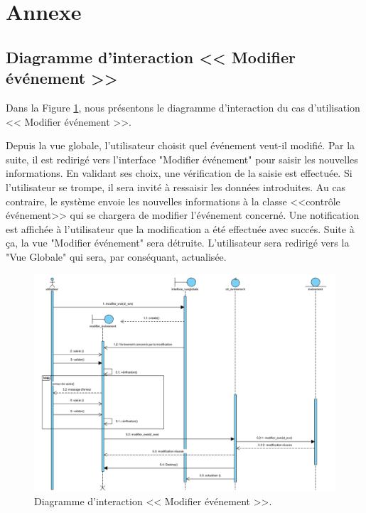 
\appendix
\chapter*{Annexe}
\renewcommand{\headrulewidth}{1pt}




\section*{Diagramme d'interaction << Modifier \'ev\'enement >>}

Dans la Figure \ref{modifierevent}, nous pr\'esentons le diagramme d'interaction du cas d'utilisation << Modifier \'ev\'enement >>. 

Depuis la vue globale, l'utilisateur choisit quel \'ev\'enement veut-il modifi\'e. Par la suite, il est redirig\'e vers l'interface "Modifier \'ev\'enement" pour saisir les nouvelles informations. En validant ses choix, une v\'erification de la saisie est effectu\'ee. Si l'utilisateur se trompe, il sera invit\'e \`a ressaisir les donn\'ees introduites. Au cas contraire, le syst\`eme envoie les nouvelles informations \`a la classe <<contr\^ole \'ev\'enement>> qui se chargera de modifier l'\'ev\'enement concern\'e. Une notification est affich\'ee \`a l'utilisateur que la modification a \'et\'e effectu\'ee avec succ\'es. Suite \`a \c{c}a, la vue "Modifier \'ev\'enement" sera d\'etruite. L'utilisateur sera redirig\'e vers la "Vue Globale" qui sera, par cons\'equant, actualis\'ee.  
\begin{landscape}
\begin{figure}[H]
	\centering
		\includegraphics[width=21cm]{images/modifier_event.PNG}
	\caption{Diagramme d'interaction << Modifier \'ev\'enement >>.}
	\label{modifierevent}
\end{figure}
\end{landscape}

